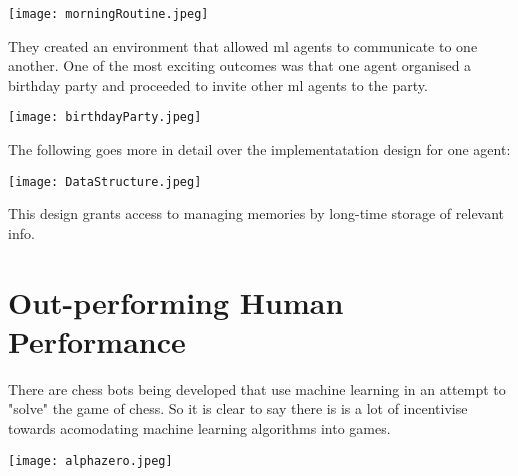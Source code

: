               \texttt{[image: morningRoutine.jpeg]}
            
            They created an environment that allowed ml agents to communicate to one another. One of the most exciting outcomes was that one agent organised a birthday party and proceeded to invite other ml agents to the party. 

            \texttt{[image: birthdayParty.jpeg]}

            The following goes more in detail over the implementatation design for one agent:
            
            \texttt{[image: DataStructure.jpeg]}
            
            This design grants access to managing memories by long-time storage of relevant info. 

      
      \section*{Out-performing Human Performance}
          
          There are chess bots being developed that use machine learning in an attempt to "solve" the game of chess. So it is clear to say there is is a lot of incentivise towards acomodating machine learning algorithms into games.

        \texttt{[image: alphazero.jpeg]}
